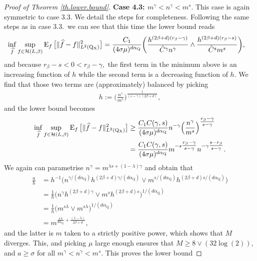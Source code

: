 \documentclass[10pt]{article}
\newcommand{\mH}{\mathcal{H}}
\newcommand{\E}{\operatorname{E}}
\newcommand{\Q}{\operatorname{Q}}
\newcommand{\wh}{\widehat}
\newcommand{\sX}{\mathrm{X}}
\begin{document}
\begin{proof}[Proof of Theorem \ref{th.lower.bound}]
    \noindent\textbf{Case 4.3: $m^\gamma < n^\gamma < m^s.$} This case is again symmetric to case 3.3. We detail the steps for completeness. Following the same steps as in case 3.3.\ we can see that this time the lower bound reads
    \begin{align*}
        \inf_{\wh f} \sup_{f \in \mH(L, \beta)}\E_{f}\big[\|\wh f - f\|_{L^2(\Q\mathstrut_{\!\sX})}^2\big] &= \frac{C_1}{(4\sigma\mu)^{d\alpha_{\Q}}}\bigg(\frac{h^{(2\beta + d)(r_\beta - \gamma)}}{\tilde C^{\gamma}n^{\gamma}} \wedge \frac{h^{(2\beta + d)(r_\beta - s)}}{\tilde C^s m^s}\bigg),
    \end{align*}
    and because $r_\beta - s < 0 < r_\beta - \gamma,$ the first term in the minimum above is an increasing function of $h$ while the second term is a decreasing function of $h.$ We find that those two terms are (approximately) balanced by picking 
    \begin{align*}
        h := \Big(\frac{n^\gamma}{m^s}\Big)^{\tfrac{1}{(s - \gamma)(2\beta + d)}},
    \end{align*}
    and the lower bound becomes
    \begin{align*}
        \inf_{\wh f} \sup_{f \in \mH(L, \beta)}\E_{f}\big[\|\wh f - f\|_{L^2(\Q\mathstrut_{\!\sX})}^2\big] &\geq \frac{C_1 C(\gamma, s)}{(4\sigma\mu)^{d\alpha_{\Q}}}n^{-\gamma}\Big(\frac{n^\gamma}{m^s}\Big)^{\tfrac{r_\beta - \gamma}{s - \gamma}}\\
        &= \frac{C_1 C(\gamma, s)}{(4\sigma\mu)^{d\alpha_{\Q}}}m^{-s\tfrac{r_\beta - \gamma}{s - \gamma}}n^{-\gamma\tfrac{s - r_\beta}{s - \gamma}}.
    \end{align*}
    We again can parametrise $n^{\gamma} = m^{\lambda s + (1 - \lambda)\gamma}$ and obtain that
    \begin{align*}
        \frac{a}{h} &= h^{-1} \Big(n^{\gamma/(d\alpha_{\Q})}h^{(2\beta + d)\gamma/(d\alpha_{\Q})} \vee m^{s/(d\alpha_{\Q})}h^{(2\beta + d)s/(d\alpha_{\Q})}\Big)\\
        &= \frac 1h\Big(n^{\gamma}h^{(2\beta + d)\gamma} \vee m^{s}h^{(2\beta + d)s}\Big)^{1/(d\alpha_{\Q})}\\
        &= \frac 1h\big(m^{s\lambda} \vee m^{s\lambda}\big)^{1/(d\alpha_{\Q})}\\
        &= m^{\tfrac{s\lambda}{d\alpha_{\Q}} + \tfrac{(1 - \lambda)}{2\beta + d}},
    \end{align*}
    and the latter is $m$ taken to a strictly positive power, which shows that $M$ diverges. This, and picking $\mu$ large enough ensures that $M \geq 8\vee (32\log(2)),$ and $a \geq \sigma$ for all $m^\gamma < n^\gamma < m^s.$ This proves the lower bound

\end{proof}
\end{document}
